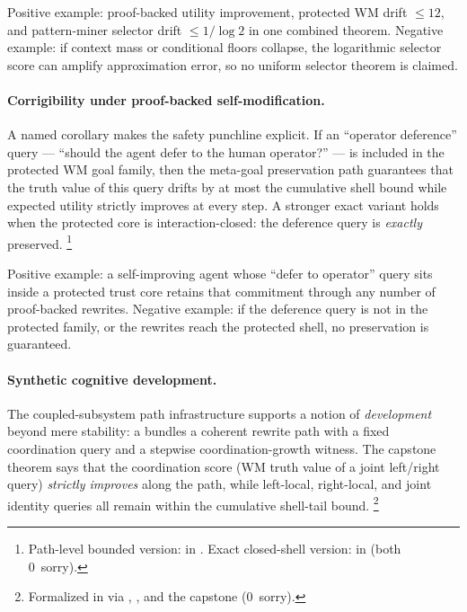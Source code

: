 \documentclass[11pt,openany]{report}
\begin{document}
\noindent
Positive example: proof-backed utility improvement, protected WM drift
$\le 12$, and pattern-miner selector drift $\le 1/\log 2$ in one combined
theorem.
Negative example: if context mass or conditional floors collapse, the
logarithmic selector score can amplify approximation error, so no uniform
selector theorem is claimed.

\paragraph{Corrigibility under proof-backed self-modification.}

A named corollary makes the safety punchline explicit.  If an
``operator deference'' query --- ``should the agent defer to the human
operator?'' --- is included in the protected WM goal family, then the
meta-goal preservation path guarantees that the truth value of this query
drifts by at most the cumulative shell bound while expected utility strictly
improves at every step.  A stronger exact variant holds when the protected
core is interaction-closed: the deference query is \emph{exactly} preserved.%
\footnote{Path-level bounded version:
in .
Exact closed-shell version:
in 
(both 0~sorry).}

\noindent
Positive example: a self-improving agent whose ``defer to operator'' query
sits inside a protected trust core retains that commitment through any
number of proof-backed rewrites.
Negative example: if the deference query is not in the protected family, or
the rewrites reach the protected shell, no preservation is guaranteed.

\paragraph{Synthetic cognitive development.}

The coupled-subsystem path infrastructure supports a notion of
\emph{development} beyond mere stability: a
 bundles a coherent rewrite path with
a fixed coordination query and a stepwise coordination-growth witness.  The
capstone theorem says that the coordination score (WM truth value of a joint
left/right query) \emph{strictly improves} along the path, while left-local,
right-local, and joint identity queries all remain within the cumulative
shell-tail bound.%
\footnote{Formalized in
via ,
, and the capstone
(0~sorry).}
\end{document}
